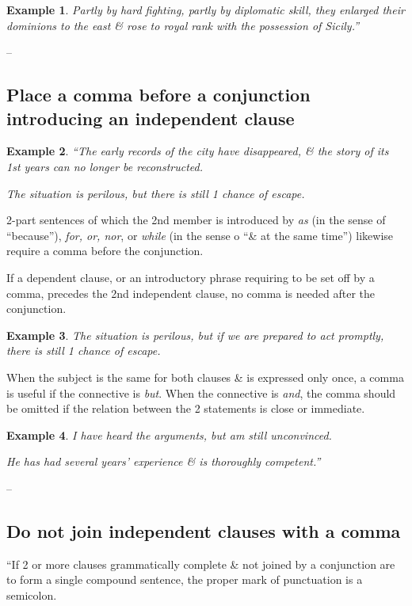 \documentclass[oneside]{book}
\numberwithin{equation}{section}
\newtheorem{example}{Example}[chapter]
\begin{document}
\begin{example}
	Partly by hard fighting, partly by diplomatic skill, they enlarged their dominions to the east \& rose to royal rank with the possession of Sicily.''
\end{example}
-- \cite[Chap. 1, Sect. 3, pp. 16--17]{Strunk_White2019}

\subsection{Place a comma before a conjunction introducing an independent clause}

\begin{example}
	``The early records of the city have disappeared, \& the story of its 1st years can no longer be reconstructed.
	
	The situation is perilous, but there is still 1 chance of escape.
\end{example}
2-part sentences of which the 2nd member is introduced by \textit{as} (in the sense of ``because''), \textit{for, or, nor}, or \textit{while} (in the sense o ``\& at the same time'') likewise require a comma before the conjunction.

If a dependent clause, or an introductory phrase requiring to be set off by a comma, precedes the 2nd independent clause, no comma is needed after the conjunction.

\begin{example}
	The situation is perilous, but if we are prepared to act promptly, there is still 1 chance of escape.
\end{example}
When the subject is the same for both clauses \& is expressed only once, a comma is useful if the connective is \textit{but}. When the connective is \textit{and}, the comma should be omitted if the relation between the 2 statements is close or immediate.

\begin{example}
	I have heard the arguments, but am still unconvinced.
	
	He has had several years' experience \& is thoroughly competent.''
\end{example}
-- \cite[Chap. 1, Sect. 4, p. 18]{Strunk_White2019}

\subsection{Do not join independent clauses with a comma}
``If 2 or more clauses grammatically complete \& not joined by a conjunction are to form a single compound sentence, the proper mark of punctuation is a semicolon.
\end{document}
